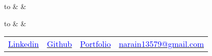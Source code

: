 \documentclass[10pt,a4]{article}
\begin{document}
{\selectfont	
	\renewcommand{\familydefault}{\sfdefault}

	\noindent
	\begin{tabu} to \textwidth {X[1] X[c] X[r]}
		  &    &   		\\
	\begin{tabu} to \textwidth {X[1] X[c] X[r]}
		  &    &   		\\
	\end{tabu}

 
	

    \begin{center}
    \begin{tabular} {p{} p{} p{} p{}}
        \raggedright\href{https://wwww.linkedin.com/in/narainp}{\textcolor{blue}{Linkedin}} & 
        \href{https://github.com/narain1}{\textcolor{blue}{Github}} & 
        \href{https://about.narain.dev}{\textcolor{blue}{Portfolio}} & 
        \raggedright\href{mailto:narain13579@gmail.com}{\textcolor{blue}{narain13579@gmail.com}} 
 

\end{tabular}
\end{center}
\end{tabu}}
\end{document}
